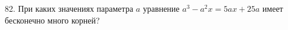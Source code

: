 82. При каких значениях параметра $a$ уравнение $a^3-a^2x=5ax+25a$ имеет бесконечно много корней?\\
